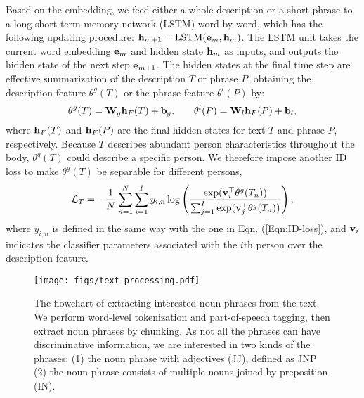 \documentclass[runningheads]{llncs}
\begin{document}
Based on the embedding, we feed either a whole description or a short phrase to a long short-term memory network 
(LSTM) word by word, which has the following updating procedure: $\bold{h}_{m+1} = \text{LSTM}(\bold{e}_{m}, \bold{h}_{m})$. The LSTM unit takes the current word embedding $\bold{e}_{m}$ and hidden state $\bold{h}_{m}$ as inputs,  and outputs the hidden state of the next step $\bold{e}_{m+1}$.
The hidden states at the final time step are effective summarization of the description $T$ or phrase $P$, obtaining the description feature $\theta^{g}(T)$ or  the phrase feature $\theta^{l}(P)$ by:
\begin{equation}\small
  \theta^{g}(T) = \bold{W}_{g} \bold{h}_{F}(T) + \bold{b}_{g}, \qquad \theta^{l}(P) = \bold{W}_{l}\bold{h}_{F}(P) + \bold{b}_{l},
\end{equation}
where $\bold{h}_{F}(T)$ and $\bold{h}_{F}(P)$ are the final hidden states for text $T$ and phrase $P$, respectively. Because $T$ describes abundant person characteristics throughout the body, $\theta^{g}(T)$ could describe a specific person. We therefore impose another ID loss to make $\theta^{g}(T)$ be separable for different persons,
\begin{equation}\small
\mathcal{L}_{T} = - \frac{1}{N}\sum_{n=1}^{N} \sum_{i=1}^{I} y_{i,n}\log\left(\frac{\exp(\bold{v}_{i}^{\top} \theta^{g}(T_{n}))}{\sum_{j=1}^{I}\exp(\bold{v}_{j}^{\top} \theta^{g}(T_{n}))} \right),
\end{equation}
where $y_{i,n}$ is defined in the same way with the one in Eqn. (\ref{Eqn:ID-loss}), and $\bold{v}_{i}$ indicates the classifier parameters associated with the $i$th person over the description feature.
 
 \begin{figure}[t]
 \vspace{-1em}
 \centering
\texttt{[image: figs/text\_processing.pdf]}
 \vspace{-1em}
 \caption{The flowchart of extracting interested noun phrases from the text. We perform  word-level tokenization and part-of-speech tagging, then extract noun phrases by chunking. As not all the phrases can have discriminative information, we are interested in two kinds of the phrases: (1) the noun phrase with adjectives (JJ), defined as JNP (2) the noun phrase consists of multiple nouns joined by preposition (IN).}  \label{fig:noun-phrase-extraction} 
\vspace{-1em}
\end{figure}
\end{document}
